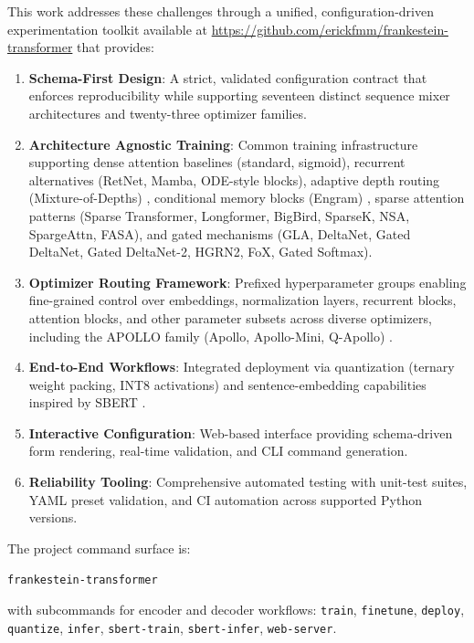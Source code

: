 This work addresses these challenges through a unified, configuration-driven experimentation toolkit available at \url{https://github.com/erickfmm/frankestein-transformer} that provides:
\begin{enumerate}[leftmargin=*]
    \item \textbf{Schema-First Design}: A strict, validated configuration contract that enforces reproducibility while supporting seventeen distinct sequence mixer architectures and twenty-three optimizer families.
    \item \textbf{Architecture Agnostic Training}: Common training infrastructure supporting dense attention baselines (standard, sigmoid), recurrent alternatives (RetNet, Mamba, ODE-style blocks), adaptive depth routing (Mixture-of-Depths) \citep{zhu2026mixtureofdepthsattention}, conditional memory blocks (Engram) \citep{cheng2026conditionalmemoryscalablelookup}, sparse attention patterns (Sparse Transformer, Longformer, BigBird, SparseK, NSA, SpargeAttn, FASA), and gated mechanisms (GLA, DeltaNet, Gated DeltaNet, Gated DeltaNet-2, HGRN2, FoX, Gated Softmax).
    \item \textbf{Optimizer Routing Framework}: Prefixed hyperparameter groups enabling fine-grained control over embeddings, normalization layers, recurrent blocks, attention blocks, and other parameter subsets across diverse optimizers, including the APOLLO family (Apollo, Apollo-Mini, Q-Apollo) \citep{zhu2025apollosgdlikememoryadamwlevel}.
    \item \textbf{End-to-End Workflows}: Integrated deployment via quantization (ternary weight packing, INT8 activations) and sentence-embedding capabilities inspired by SBERT \citep{reimers_sentence-bert_2019}.
    \item \textbf{Interactive Configuration}: Web-based interface providing schema-driven form rendering, real-time validation, and CLI command generation.
    \item \textbf{Reliability Tooling}: Comprehensive automated testing with unit-test suites, YAML preset validation, and CI automation across supported Python versions.
\end{enumerate}

The project command surface is:
\begin{center}
\texttt{frankestein-transformer}
\end{center}
with subcommands for encoder and decoder workflows:
\texttt{train}, \texttt{finetune}, \texttt{deploy}, \texttt{quantize}, \texttt{infer}, \texttt{sbert-train}, \texttt{sbert-infer}, \texttt{web-server}.


